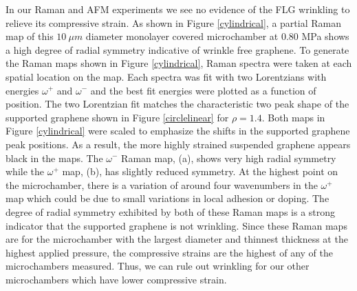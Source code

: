 In our Raman and AFM experiments we see no evidence of the FLG wrinkling to relieve its compressive strain. As shown in Figure \ref{cylindrical}, a partial Raman map of this $10 \ \mu m$ diameter monolayer covered microchamber at 0.80 MPa shows a high degree of radial symmetry indicative of wrinkle free graphene.  To generate the Raman maps shown in Figure \ref{cylindrical}, Raman spectra were taken at each spatial location on the map.  Each spectra was fit with two Lorentzians with energies $\omega^+$ and $\omega^-$ and the best fit energies were plotted as a function of position. The two Lorentzian fit matches the characteristic two peak shape of the supported graphene shown in Figure \ref{circlelinear} for $\rho=1.4$.  Both maps in Figure \ref{cylindrical} were scaled to emphasize the shifts in the supported graphene peak positions.  As a result, the more highly strained suspended graphene appears black in the maps.  The $\omega^-$ Raman map, (a), shows very high radial symmetry while the $\omega^+$ map, (b), has slightly reduced symmetry.  At the highest point on the microchamber, there is a variation of around four wavenumbers in the $\omega^+$ map which could be due to small variations in local adhesion or doping.  The degree of radial symmetry exhibited by both of these Raman maps is a strong indicator that the supported graphene is not wrinkling.  Since these Raman maps are for the microchamber with the largest diameter and thinnest thickness at the highest applied pressure, the compressive strains are the highest of any of the microchambers measured.  Thus, we can rule out wrinkling for our other microchambers which have lower compressive strain.

